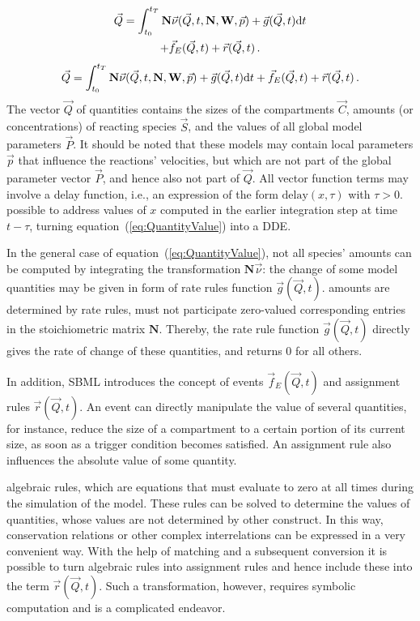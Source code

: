 \documentclass[10pt]{bmc_article}
\newenvironment{bmcformat}{\fussy\setboolean{publ}{true}}{\fussy}
\begin{document}
\begin{bmcformat}
{\begin{multline}
\vec{Q} = \int_{t_0}^{t_T} \mathbf{N}\vec{\nu}(\vec{Q}, t, \mathbf{N}, \mathbf{W},
\vec{p}) + \vec{g}(\vec{Q}, t)\mathrm{d} t\\ 
+ \vec{f}_E(\vec{Q}, t) + \vec{r}(\vec{Q}, t)\,.
\label{eq:QuantityValue}
\end{multline}}{\begin{equation}
\vec{Q} = \int_{t_0}^{t_T} \mathbf{N}\vec{\nu}(\vec{Q}, t, \mathbf{N}, \mathbf{W},
\vec{p}) + \vec{g}(\vec{Q}, t)\mathrm{d} t + \vec{f}_E(\vec{Q}, t) + \vec{r}(\vec{Q}, t)\,.
\label{eq:QuantityValue}
\end{equation}}
The vector $\vec{Q}$ of quantities contains the sizes of the
compartments $\vec{C}$, amounts (or concentrations) of reacting species
$\vec{S}$, and the values of all global model parameters $\vec{P}$.
It should be noted that these models may contain local parameters $\vec{p}$ that
influence the reactions' velocities, but which are not part of the global parameter
vector $\vec{P}$, and hence also not part of $\vec{Q}$.
All vector function terms may involve a delay function, i.e., an expression of 
the form $\mathrm{delay}(x, \tau)$ with $\tau > 0$. 
 possible to address values of $x$ computed in the earlier
integration step at time  $t - \tau$, turning equation~(\ref{eq:QuantityValue})
into a \acf{DDE}.

In the general case of equation~(\ref{eq:QuantityValue}), not all species' amounts
can be computed by integrating the transformation $\mathbf{N}\vec{\nu}$: the
change of some model quantities may be given in  form of rate rules 
function $\vec{g}(\vec{Q}, t)$.
 amounts are determined by rate rules, must not participate  zero-valued corresponding entries in the
stoichiometric matrix $\mathbf{N}$.
Thereby, the rate rule function $\vec{g}(\vec{Q}, t)$ directly gives the rate of
change of these quantities, and returns 0 for all others.

In addition, \acs{SBML} introduces the concept of events $\vec{f}_E(\vec{Q}, t)$ and
assignment rules $\vec{r}(\vec{Q}, t)$.
An event can directly manipulate the value of several quantities, for instance,
reduce the size of a compartment to a certain portion of its current size,
as soon as a trigger condition becomes satisfied.
An assignment rule also influences the absolute value of some quantity.

 algebraic rules, which are equations that
must evaluate to zero at all times during the simulation of the model.
These rules can be solved to determine the values of quantities, whose values
are not determined by  other construct.
In this way, conservation relations or other complex interrelations can be
expressed in a very convenient way.
With the help of  matching \cite{hopcroft1973n} and a subsequent conversion it is possible
to turn algebraic rules into assignment rules and hence include these into the
term $\vec{r}(\vec{Q}, t)$.
Such a transformation, however, requires symbolic computation and is
 a complicated endeavor.


\end{bmcformat}
\end{document}
